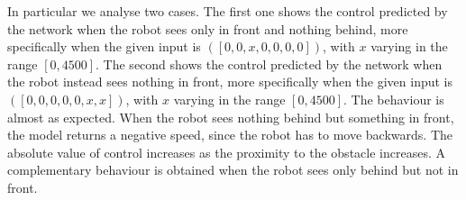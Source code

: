 In particular we analyse two cases. The first one shows the control predicted by 
the network when the robot sees only in front and nothing behind, more 
specifically when the given input is  $([0, 0, x, 0, 0, 0, 0])$, with $x$ varying in the 
range $[0, 4500]$.
The second shows the control predicted by the network when the robot instead 
sees nothing in front, more specifically when the given input is  $([0, 0, 0, 0, 0,x , 
x])$, with $x$ varying in the range $[0, 4500]$.
The behaviour is almost as expected. When the robot sees nothing behind but 
something in front, the model returns a negative speed, since the robot has to 
move backwards. 
The absolute value of control increases as the proximity to the obstacle increases.
A complementary behaviour is obtained when the robot sees only behind but 
not in front.

